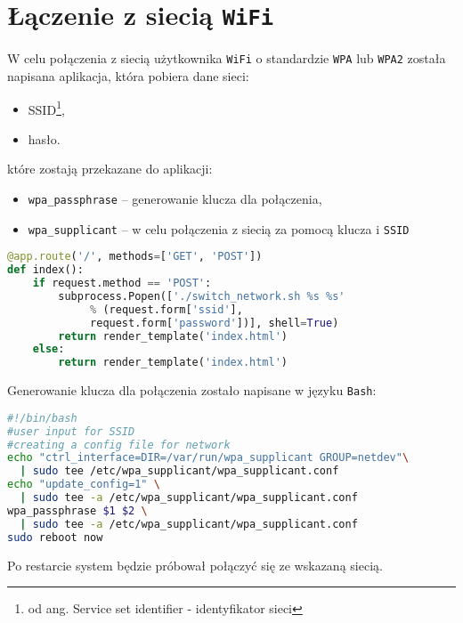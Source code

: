 \section{Łączenie z siecią \texttt{WiFi}}
W celu połączenia z siecią użytkownika \texttt{WiFi} o standardzie 
\texttt{WPA} lub \texttt{WPA2} została napisana aplikacja,
która pobiera dane sieci:
\begin{itemize}
  \item SSID\footnote{od ang. Service set identifier - identyfikator sieci},
  \item hasło.
\end{itemize}
które zostają przekazane do aplikacji:
\begin{itemize}
  \item \texttt{wpa\_passphrase} -- generowanie klucza dla połączenia,
  \item \texttt{wpa\_supplicant} -- w celu połączenia z siecią za pomocą
    klucza i \texttt{SSID}
\end{itemize}
\begin{lstlisting}[frame=single, basicstyle=\ttfamily\small, language=python,
caption={Pobieranie danych z form za pomocą metody \texttt{POST}}]
@app.route('/', methods=['GET', 'POST'])
def index():
    if request.method == 'POST':
        subprocess.Popen(['./switch_network.sh %s %s'
			 % (request.form['ssid'],
			 request.form['password'])], shell=True)
        return render_template('index.html')
    else:
        return render_template('index.html')
\end{lstlisting}
Generowanie klucza dla połączenia zostało napisane w języku \texttt{Bash}:
\begin{lstlisting}[frame=single, basicstyle=\ttfamily\small, language=bash,
caption={Generowanie klucza połączenia}]
#!/bin/bash
#user input for SSID
#creating a config file for network
echo "ctrl_interface=DIR=/var/run/wpa_supplicant GROUP=netdev"\
  | sudo tee /etc/wpa_supplicant/wpa_supplicant.conf
echo "update_config=1" \
  | sudo tee -a /etc/wpa_supplicant/wpa_supplicant.conf
wpa_passphrase $1 $2 \
  | sudo tee -a /etc/wpa_supplicant/wpa_supplicant.conf
sudo reboot now
\end{lstlisting}
Po restarcie system będzie próbował połączyć się ze wskazaną siecią.

